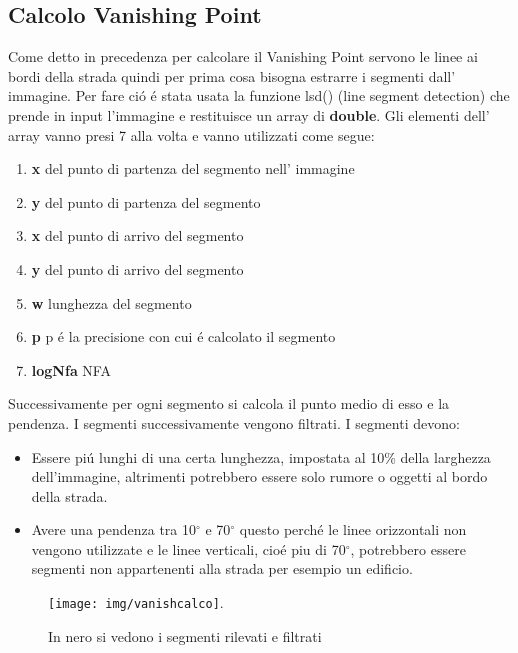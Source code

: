 	\subsection{Calcolo Vanishing Point}
		Come detto in precedenza per calcolare il Vanishing Point servono le linee ai bordi della strada quindi per prima cosa bisogna estrarre i segmenti dall' immagine. Per fare ci\'o \'e stata usata la funzione lsd() (line segment detection) che prende in input l'immagine e restituisce un array di \textbf{double}.
		Gli elementi dell' array vanno presi 7 alla volta e vanno utilizzati come segue:
		\begin{enumerate}
			\item \textbf{x} del punto di partenza del segmento nell' immagine
			\item \textbf{y} del punto di partenza del segmento
			\item \textbf{x} del punto di arrivo del segmento
			\item \textbf{y} del punto di arrivo del segmento
			\item \textbf{w} lunghezza del segmento
			\item \textbf{p} p \'e la precisione con cui \'e calcolato il segmento
			\item \textbf{logNfa} NFA
		\end{enumerate}
		Successivamente per ogni segmento si calcola il punto medio di esso e la pendenza. I segmenti successivamente vengono filtrati.
		I segmenti devono:
		\begin{itemize}
			\item Essere pi\'u lunghi di una certa lunghezza, impostata al 10\% della larghezza dell'immagine, altrimenti potrebbero essere solo rumore o oggetti al bordo della strada.
			\item Avere una pendenza tra 10$^{\circ}$ e 70$^{\circ}$ questo perch\'e le linee orizzontali non vengono utilizzate e le linee verticali, cio\'e piu di 70$^{\circ}$, potrebbero essere segmenti non appartenenti alla strada per esempio un edificio.
		\end{itemize}
		\begin{figure}[!ht]
			\centering
			\texttt{[image: img/vanishcalco]}.
			\caption{In nero si vedono i segmenti rilevati e filtrati}
		\end{figure}

